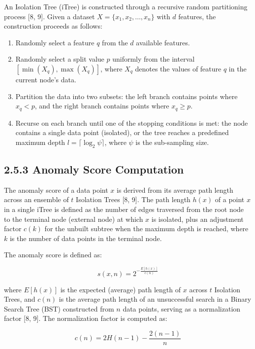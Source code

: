 \documentclass[
  a4paper]{report}
\providecommand{\tightlist}{%
  \setlength{\itemsep}{0pt}\setlength{\parskip}{0pt}}
\begin{document}
An Isolation Tree (iTree) is constructed through a recursive random
partitioning process {[}8, 9{]}. Given a dataset
\(X = \{x_1, x_2, \ldots, x_n\}\) with \(d\) features, the construction
proceeds as follows:

\begin{enumerate}
\def\labelenumi{\arabic{enumi}.}
\tightlist
\item
  Randomly select a feature \(q\) from the \(d\) available features.
\item
  Randomly select a split value \(p\) uniformly from the interval
  \([\min(X_q), \max(X_q)]\), where \(X_q\) denotes the values of
  feature \(q\) in the current node's data.
\item
  Partition the data into two subsets: the left branch contains points
  where \(x_q < p\), and the right branch contains points where
  \(x_q \geq p\).
\item
  Recurse on each branch until one of the stopping conditions is met:
  the node contains a single data point (isolated), or the tree reaches
  a predefined maximum depth \(l = \lceil \log_2 \psi \rceil\), where
  \(\psi\) is the sub-sampling size.
\end{enumerate}

\subsection{2.5.3 Anomaly Score
Computation}\label{anomaly-score-computation}

The anomaly score of a data point \(x\) is derived from its average path
length across an ensemble of \(t\) Isolation Trees {[}8, 9{]}. The path
length \(h(x)\) of a point \(x\) in a single iTree is defined as the
number of edges traversed from the root node to the terminal node
(external node) at which \(x\) is isolated, plus an adjustment factor
\(c(k)\) for the unbuilt subtree when the maximum depth is reached,
where \(k\) is the number of data points in the terminal node.

The anomaly score is defined as:

\[s(x, n) = 2^{-\frac{E[h(x)]}{c(n)}}\]

where \(E[h(x)]\) is the expected (average) path length of \(x\) across
\(t\) Isolation Trees, and \(c(n)\) is the average path length of an
unsuccessful search in a Binary Search Tree (BST) constructed from \(n\)
data points, serving as a normalization factor {[}8, 9{]}. The
normalization factor is computed as:

\[c(n) = 2H(n-1) - \frac{2(n-1)}{n}\]
\end{document}
